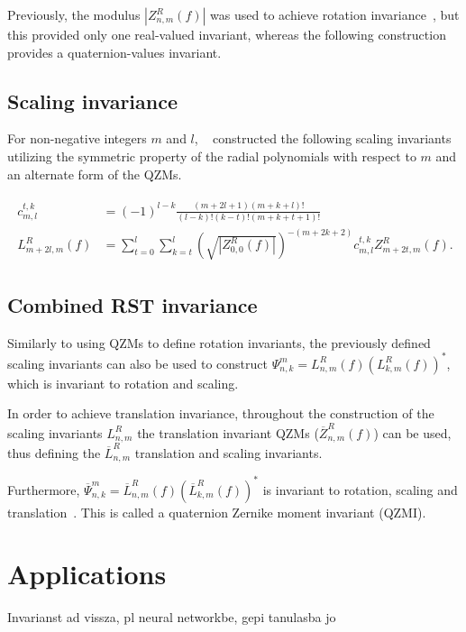 Previously, the modulus $|Z_{n,m}^R(f)|$ was used to achieve rotation invariance~\cite{qzm}, but this provided only one real-valued invariant, whereas the following construction provides a quaternion-values invariant.

\subsection{Scaling invariance}
For non-negative integers $m$ and $l$, \citeauthor{qzmi}~\cite{qzmi} constructed the following scaling invariants utilizing the symmetric property of the radial polynomials with respect to $m$ and an alternate form of the QZMs.

\begin{gather*}
  \begin{split}
  c_{m,l}^{t,k} &= (-1)^{l-k}\frac{(m + 2l + 1)(m + k + l)!}{(l - k)!(k - t)!(m + k + t + 1)!} \\
  L_{m + 2l,m}^R(f) &= \sum_{t=0}^l\sum_{k=t}^l\left(\sqrt{|Z_{0,0}^R(f)|}\right)^{-(m+2k+2)}c_{m,l}^{t,k}Z_{m+2t,m}^R(f).
  \end{split}
\end{gather*}

\subsection{Combined RST invariance}
Similarly to using QZMs to define rotation invariants, the previously defined scaling invariants can also be used to construct $\Psi_{n,k}^m = L_{n,m}^R(f)(L_{k,m}^R(f))^*$, which is invariant to rotation and scaling.

In order to achieve translation invariance, throughout the construction of the scaling invariants $L_{n,m}^R$ the translation invariant QZMs ($\overline{Z}_{n,m}^R(f)$) can be used, thus defining the $\overline{L}_{n,m}^R$ translation and scaling invariants.

Furthermore, $\overline{\Psi}_{n,k}^m = \overline{L}_{n,m}^R(f)(\overline{L}_{k,m}^R(f))^*$ is invariant to rotation, scaling and translation~\cite{qzmi}. This is called a quaternion Zernike moment invariant (QZMI).

\section{Applications}
Invarianst ad vissza, pl neural networkbe, gepi tanulasba jo